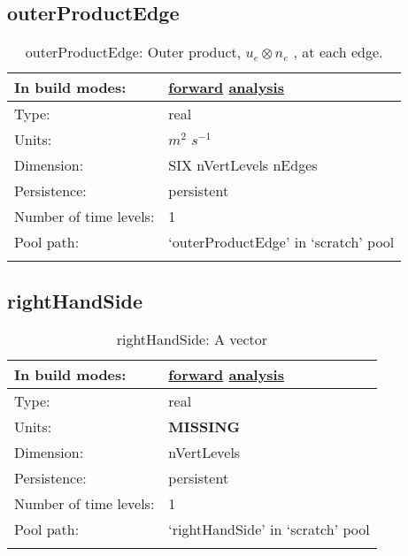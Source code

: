 \subsection[outerProductEdge]{outerProductEdge}
\label{subsec:var_sec_scratch_outerProductEdge}
\begin{center}
\begin{longtable}{| p{2.0in} | p{4.0in} |}
        \hline 
        In build modes: & \hyperref[subsec:forward_var_tab_scratch]{forward} \hyperref[subsec:analysis_var_tab_scratch]{analysis} \\
        \hline 
        Type: & real \\
        \hline 
        Units: & $m^2$ $s^{-1}$ \\
        \hline 
        Dimension: & SIX nVertLevels nEdges \\
        \hline 
        Persistence: & persistent \\
        \hline 
        Number of time levels: & 1 \\
        \hline 
            Pool path: & `outerProductEdge' in `scratch' pool \\
		 \hline 
    \caption{outerProductEdge:  Outer product,  $u_e \otimes n_e$ , at each edge.}
\end{longtable}
\end{center}
\subsection[rightHandSide]{rightHandSide}
\label{subsec:var_sec_scratch_rightHandSide}
\begin{center}
\begin{longtable}{| p{2.0in} | p{4.0in} |}
        \hline 
        In build modes: & \hyperref[subsec:forward_var_tab_scratch]{forward} \hyperref[subsec:analysis_var_tab_scratch]{analysis} \\
        \hline 
        Type: & real \\
        \hline 
        Units: & {\bf \color{red} MISSING} \\
        \hline 
        Dimension: & nVertLevels \\
        \hline 
        Persistence: & persistent \\
        \hline 
        Number of time levels: & 1 \\
        \hline 
            Pool path: & `rightHandSide' in `scratch' pool \\
		 \hline 
    \caption{rightHandSide: A vector}
\end{longtable}
\end{center}

